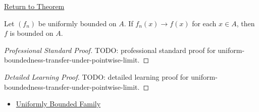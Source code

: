 \newpage
{}
\label{prf:uniform-boundedness-transfer-under-pointwise-limit}

\begin{remark*}[Return]
\hyperref[thm:uniform-boundedness-transfer-under-pointwise-limit]{Return to Theorem}
\end{remark*}

\begin{theorem*}
Let \((f_n)\) be uniformly bounded on \(A\).  If \(f_n(x)\to f(x)\) for each
\(x\in A\), then \(f\) is bounded on \(A\).
\end{theorem*}

\begin{proof}[Professional Standard Proof]
\LRAProofBodyStart
TODO: professional standard proof for uniform-boundedness-transfer-under-pointwise-limit.
\end{proof}

\begin{proof}[Detailed Learning Proof]
\LRAProofBodyStart
TODO: detailed learning proof for uniform-boundedness-transfer-under-pointwise-limit.
\end{proof}

\begin{remark*}
\end{remark*}

\begin{dependencies}
\begin{itemize}
  \item \hyperref[def:uniformly-bounded-family]{Uniformly Bounded Family}
\end{itemize}
\end{dependencies}

\clearpage
